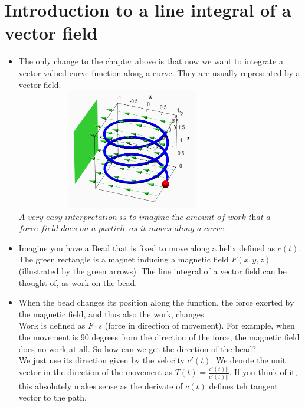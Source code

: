 \documentclass[12pt,a4paper]{article}
\begin{document}
	\section{Introduction to a line integral of a vector field}
	
	\begin{itemize}
	\item The only change to the chapter above is that now we want to integrate a vector valued curve function along a curve. They are usually represented by a vector field.\\	\includegraphics[width=0.8\textwidth, height = 200px]{Field_Helix.png}
	\\ $\textit{A very easy interpretation is to imagine the amount of work that a}$\\ $\textit{force field does on a particle as it moves along a curve.}$
	
	\item Imagine you have a Bead that is fixed to move along a helix defined as $c(t)$. The green rectangle is a magnet inducing a magnetic field $F(x,y,z)$(illustrated by the green arrows). The line integral of a vector field can be thought of, as work on the bead. 
	
	\item When the bead changes its position along the function, the force exorted by the magnetic field, and thus also the work, changes.\\
	
	Work is defined as $F\cdot s$ (force in direction of movement). For example, when the movement is 90 degrees from the direction of the force, the magnetic field does no work at all. So how can we get the direction of the bead? \\
	
	We just use its direction given by the velocity $c'(t)$. We denote the unit vector in the direction of the movement as $T(t) = \frac{c'(t)||}{c'(t)||}$. If you think of it, this absolutely makes sense as the derivate of $c(t)$ defines teh tangent vector to the path. 
	

\end{itemize}
\end{document}
